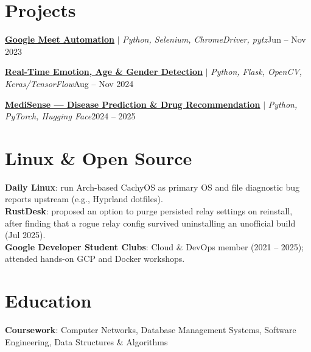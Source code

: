 \documentclass[a4paper]{article}
\begin{document}
\section{Projects}
    \resumeSubHeadingListStart
      \resumeProjectHeading
        {\href{https://github.com/ep0chzero/google_meet_automation}{\textbf{Google Meet Automation}} $|$ \emph{Python, Selenium, ChromeDriver, pytz}}{Jun -- Nov 2023}
      \resumeItemListStart
      \resumeItemListEnd

      \resumeProjectHeading
        {\href{https://github.com/ep0chzero/realtime-emogenage}{\textbf{Real-Time Emotion, Age \& Gender Detection}} $|$ \emph{Python, Flask, OpenCV, Keras/TensorFlow}}{Aug -- Nov 2024}
      \resumeItemListStart
      \resumeItemListEnd

      \resumeProjectHeading
        {\href{https://github.com/ep0chzero/Disease-Prediction-and-Drug-Recommendation-Prototype}{\textbf{MediSense --- Disease Prediction \& Drug Recommendation}} $|$ \emph{Python, PyTorch, Hugging Face}}{2024 -- 2025}
      \resumeItemListStart
      \resumeItemListEnd
    \resumeSubHeadingListEnd
\vspace{-4pt}

\section{Linux \& Open Source}
\begin{resumeBlock}
\textbf{Daily Linux}{: run Arch-based CachyOS as primary OS and file diagnostic bug reports upstream (e.g., Hyprland dotfiles).} \\
\textbf{RustDesk}{: proposed an option to purge persisted relay settings on reinstall, after finding that a rogue relay config survived uninstalling an unofficial build (Jul 2025).} \\
\textbf{Google Developer Student Clubs}{: Cloud \& DevOps member (2021 -- 2025); attended hands-on GCP and Docker workshops.}
\end{resumeBlock}
\vspace{-6pt}

\section{Education}
  \resumeSubHeadingListStart
    \eduGNIT
  \resumeSubHeadingListEnd
\vspace{-8pt}
\begin{resumeBlock}
\textbf{Coursework}{: Computer Networks, Database Management Systems, Software Engineering, Data Structures \& Algorithms}
\end{resumeBlock}
\end{document}

